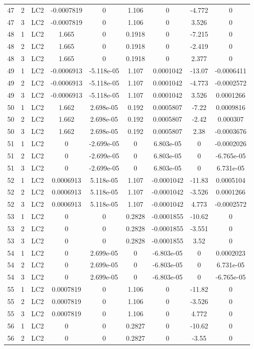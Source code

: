\documentclass{article}%
\begin{document}
\begin{longtable}{| c c c | c c c c c c |}
47&2&LC2&{-}0.0007819&0&1.106&0&{-}4.772&0\\%
47&3&LC2&{-}0.0007819&0&1.106&0&3.526&0\\%
48&1&LC2&1.665&0&0.1918&0&{-}7.215&0\\%
48&2&LC2&1.665&0&0.1918&0&{-}2.419&0\\%
48&3&LC2&1.665&0&0.1918&0&2.377&0\\%
49&1&LC2&{-}0.0006913&{-}5.118e{-}05&1.107&0.0001042&{-}13.07&{-}0.0006411\\%
49&2&LC2&{-}0.0006913&{-}5.118e{-}05&1.107&0.0001042&{-}4.773&{-}0.0002572\\%
49&3&LC2&{-}0.0006913&{-}5.118e{-}05&1.107&0.0001042&3.526&0.0001266\\%
50&1&LC2&1.662&2.698e{-}05&0.192&0.0005807&{-}7.22&0.0009816\\%
50&2&LC2&1.662&2.698e{-}05&0.192&0.0005807&{-}2.42&0.000307\\%
50&3&LC2&1.662&2.698e{-}05&0.192&0.0005807&2.38&{-}0.0003676\\%
51&1&LC2&0&{-}2.699e{-}05&0&6.803e{-}05&0&{-}0.0002026\\%
51&2&LC2&0&{-}2.699e{-}05&0&6.803e{-}05&0&{-}6.765e{-}05\\%
51&3&LC2&0&{-}2.699e{-}05&0&6.803e{-}05&0&6.731e{-}05\\%
52&1&LC2&0.0006913&5.118e{-}05&1.107&{-}0.0001042&{-}11.83&0.0005104\\%
52&2&LC2&0.0006913&5.118e{-}05&1.107&{-}0.0001042&{-}3.526&0.0001266\\%
52&3&LC2&0.0006913&5.118e{-}05&1.107&{-}0.0001042&4.773&{-}0.0002572\\%
53&1&LC2&0&0&0.2828&{-}0.0001855&{-}10.62&0\\%
53&2&LC2&0&0&0.2828&{-}0.0001855&{-}3.551&0\\%
53&3&LC2&0&0&0.2828&{-}0.0001855&3.52&0\\%
54&1&LC2&0&2.699e{-}05&0&{-}6.803e{-}05&0&0.0002023\\%
54&2&LC2&0&2.699e{-}05&0&{-}6.803e{-}05&0&6.731e{-}05\\%
54&3&LC2&0&2.699e{-}05&0&{-}6.803e{-}05&0&{-}6.765e{-}05\\%
55&1&LC2&0.0007819&0&1.106&0&{-}11.82&0\\%
55&2&LC2&0.0007819&0&1.106&0&{-}3.526&0\\%
55&3&LC2&0.0007819&0&1.106&0&4.772&0\\%
56&1&LC2&0&0&0.2827&0&{-}10.62&0\\%
56&2&LC2&0&0&0.2827&0&{-}3.55&0\\%

\end{longtable}
\end{document}
